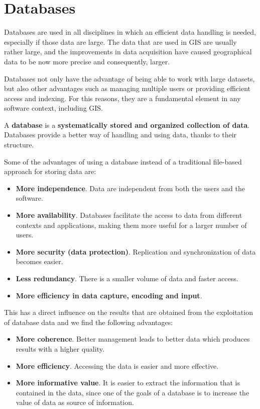 \chapter{Databases}

\pagestyle{fancy}

Databases are used in all disciplines in which an efficient data handling is needed, especially if those data are large. The data that are used in GIS are usually rather large, and the improvements in data acquisition have caused geographical data to be now more precise and consequently, larger. 

Databases not only have the advantage of being able to work with large datasets, but also other advantages such as managing multiple users or providing efficient access and indexing. For this reasons, they are a fundamental element in any software context, including GIS.

A \textbf{database} is a \textbf{systematically stored and organized collection of data}. Databases provide a better way of handling and using data, thanks to their structure.

Some of the advantages of using a database instead of a traditional file-based approach for storing data are:

\begin{itemize}
	\item \textbf{More independence}. Data are independent from both the users and the software.
	\item \textbf{More availability}. Databases facilitate the access to data from different contexts and applications, making them more useful for a larger number of users.
	\item \textbf{More security (data protection)}. Replication and synchronization of data becomes easier.
	\item \textbf{Less redundancy}. There is a smaller volume of data and faster access.
	\item \textbf{More efficiency in data capture, encoding and input}.
\end{itemize}

This has a direct influence on the results that are obtained from the exploitation of database data and we find the following advantages:

\begin{itemize}
	\item \textbf{More coherence}. Better management leads to better data which produces results with a higher quality.
	\item \textbf{More efficiency}. Accessing the data is easier and more effective.
	\item \textbf{More informative value}. It is easier to extract the information that is contained in the data, since one of the goals of a database is to increase the value of data as source of information.
\end{itemize}

